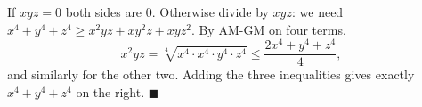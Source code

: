 If $xyz=0$ both sides are $0$. Otherwise divide by $xyz$: we need $x^4+y^4+z^4\ge x^2yz+xy^2z+xyz^2$. By AM-GM on four terms,
\[x^2yz=\sqrt[4]{x^4\cdot x^4\cdot y^4\cdot z^4}\le\dfrac{2x^4+y^4+z^4}4,\]
and similarly for the other two. Adding the three inequalities gives exactly $x^4+y^4+z^4$ on the right. $\blacksquare$
